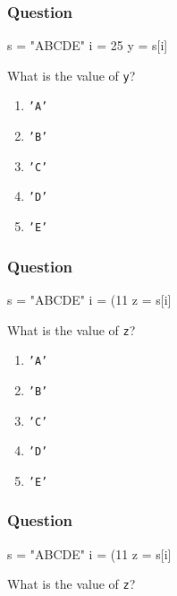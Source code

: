 \documentclass[11pt]{beamer}
\begin{document}
\begin{frame}[fragile]
  \frametitle{Question}
  \Enlarge

  \begin{semiverbatim}
s = "ABCDE"
i = 25 %
y = s[i]
  \end{semiverbatim}

  What is the value of \texttt{y}?
  \begin{enumerate}[label=\Alph*]
  \item  \texttt{'A'}
  \item  \texttt{'B'}
  \item  \texttt{'C'}
  \item  \texttt{'D'}
  \item  \texttt{'E'}
  \end{enumerate}
\end{frame}

\begin{frame}[fragile]
  \frametitle{Question}
  \Enlarge

  \begin{semiverbatim}
s = "ABCDE"
i = (11 %
z = s[i]
  \end{semiverbatim}

  What is the value of \texttt{z}?
  \begin{enumerate}[label=\Alph*]
  \item  \texttt{'A'}
  \item  \texttt{'B'}
  \item  \texttt{'C'}
  \item  \texttt{'D'}
  \item  \texttt{'E'}
  \end{enumerate}
\end{frame}

\begin{frame}[fragile]
  \frametitle{Question}
  \Enlarge

  \begin{semiverbatim}
s = "ABCDE"
i = (11 %
z = s[i]
  \end{semiverbatim}

  What is the value of \texttt{z}?
\end{frame}
\end{document}
